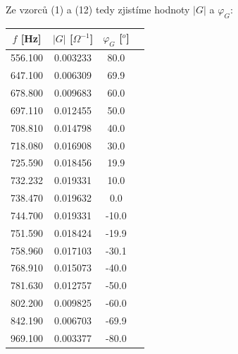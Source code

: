 \documentclass[a4paper,11pt]{article}
\begin{document}
\hspace{10pt}
\begin{minipage}[t]{0.5\textwidth} 
                Ze vzorců (1) a (12) tedy zjistíme hodnoty $\vert G\vert$ a $\varphi_G$:
                \vspace{10pt}
                \par \centering
                \begin{tabular}{|c|c|c|c|}
                    \hline
                    $f$ [Hz] & $\vert G\vert$ [$\Omega^{-1}$]  & $\varphi_G$ [$^o$] \\
                    \hline
                    556.100 & 0.003233 & 80.0 \\
                    \hline
                    647.100 & 0.006309 & 69.9 \\
                    \hline
                    678.800 & 0.009683 & 60.0 \\
                    \hline
                    697.110 & 0.012455 & 50.0 \\
                    \hline
                    708.810 & 0.014798 & 40.0 \\
                    \hline
                    718.080 & 0.016908 & 30.0 \\
                    \hline
                    725.590 & 0.018456 & 19.9 \\
                    \hline
                    732.232 & 0.019331 & 10.0 \\
                    \hline
                    738.470 & 0.019632 & 0.0 \\
                    \hline
                    744.700 & 0.019331 & -10.0 \\
                    \hline
                    751.590 & 0.018424 & -19.9 \\
                    \hline
                    758.960 & 0.017103 & -30.1 \\
                    \hline
                    768.910 & 0.015073 & -40.0 \\
                    \hline
                    781.630 & 0.012757 & -50.0 \\
                    \hline
                    802.200 & 0.009825 & -60.0 \\
                    \hline
                    842.190 & 0.006703 & -69.9 \\
                    \hline
                    969.100 & 0.003377 & -80.0 \\
                    \hline

\end{tabular}
\end{minipage}
\end{document}
